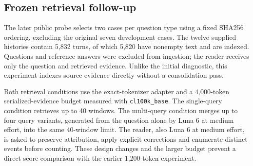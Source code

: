 \subsection{Frozen retrieval follow-up}
The later public probe selects two cases per question type using a fixed SHA256 ordering, excluding the original seven development cases. The twelve supplied histories contain 5,832 turns, of which 5,820 have nonempty text and are indexed. Questions and reference answers were excluded from ingestion; the reader receives only the question and retrieved evidence. Unlike the initial diagnostic, this experiment indexes source evidence directly without a consolidation pass.

Both retrieval conditions use the exact-tokenizer adapter and a 4,000-token serialized-evidence budget measured with \texttt{cl100k\_base}. The single-query condition retrieves up to 40 windows. The multi-query condition merges up to four query variants, generated from the question alone by Luna 6 at medium effort, into the same 40-window limit. The reader, also Luna 6 at medium effort, is asked to preserve attribution, apply explicit corrections and enumerate distinct events before counting. These design changes and the larger budget prevent a direct score comparison with the earlier 1,200-token experiment.



